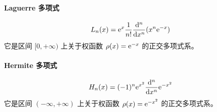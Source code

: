 \paragraph{Laguerre 多项式}
\[
    L_{n}(x) = \e^{x} \frac{1}{n!} \odv[n]{}{x} (x^n \e^{-x})
\]
它是区间 \([0, +\infty)\) 上关于权函数 \(\rho(x) = \mathrm{e}^{-x}\) 的正交多项式系。
\paragraph{Hermite 多项式}
\[
    H_{n}(x) = (-1)^{n} \e^{x^{2}} \odv[n]{}{x} \e^{-x^{2}}
\]
它是区间 \((-\infty, +\infty)\) 上关于权函数 \(\rho(x) = \mathrm{e}^{-x^2}\) 的正交多项式系。

